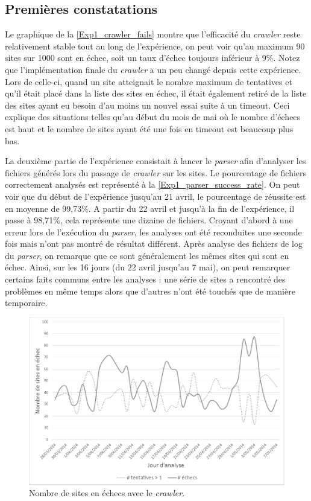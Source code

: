 \subsection{Premières constatations}
Le graphique de la \autoref{Exp1_crawler_fails} montre que l'efficacité du \textit{crawler} reste relativement stable tout au long de l'expérience, on peut voir qu'au maximum 90 sites sur 1000 sont en échec, soit un taux d'échec toujours inférieur à 9\%.
Notez que l'implémentation finale du \textit{crawler} a un peu changé depuis cette expérience. Lors de celle-ci, quand un site atteignait le nombre maximum de tentatives et qu'il était placé dans la liste des sites en échec, il était également retiré de la liste des sites ayant eu besoin d'au moins un nouvel essai suite à un timeout. Ceci explique des situations telles qu'au début du mois de mai où le nombre d'échecs est haut et le nombre de sites ayant été une fois en timeout est beaucoup plus bas.

La deuxième partie de l'expérience consistait à lancer le \textit{parser} afin d'analyser les fichiers générés lors du passage de \textit{crawler} sur les sites.
Le pourcentage de fichiers correctement analysés est représenté à la \autoref{Exp1_parser_success_rate}. On peut voir que du début de l'expérience jusqu'au 21 avril, le pourcentage de réussite est en moyenne de 99,73\%. A partir du 22 avril et jusqu'à la fin de l'expérience, il passe à 98,71\%, cela représente une dizaine de fichiers.
Croyant d'abord à une erreur lors de l'exécution du \textit{parser}, les analyses ont été reconduites une seconde fois mais n'ont pas montré de résultat différent.
Après analyse des fichiers de log du \textit{parser}, on remarque que ce sont généralement les mêmes sites qui sont en échec.
Ainsi, sur les 16 jours (du 22 avril jusqu'au 7 mai), on peut remarquer certains faits communs entre les analyses : une série de sites a rencontré des problèmes en même temps alors que d'autres n'ont été touchés que de manière temporaire.
\newline

\begin{figure}[!h]
	\centering
	\includegraphics[scale=.6]{Exp_40jours/Exp1_crawler_fails_NB.png}
	\caption{\label{Exp1_crawler_fails}Nombre de sites en échecs avec le \textit{crawler}.}
\end{figure}

